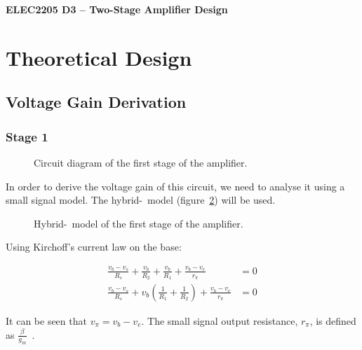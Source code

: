 \documentclass[a4paper,11pt]{article}
\begin{document}
  
\begin{center}
{\Large{\textbf{ELEC2205 D3 -- Two-Stage Amplifier Design}}} \\ [\baselineskip]

\end{center}

\begin{abstract}
\end{abstract}

\section{Theoretical Design}
\subsection{Voltage Gain Derivation}
\subsubsection{Stage 1}

\begin{figure}[h]
\centering
    
    \caption{Circuit diagram of the first stage of the amplifier.}
    \label{fig:stage1}
\end{figure}

In order to derive the voltage gain of this circuit, we need to analyse it using a small signal model. The hybrid-\textpi\ model (figure~\ref{fig:stage1hpi}) will be used.

\begin{figure}[h]
\centering
    
    \caption{Hybrid-\textpi\ model of the first stage of the amplifier.}
    \label{fig:stage1hpi}
\end{figure}

Using Kirchoff's current law on the base:

\begin{subequations}
\begin{align}
\frac{v_b - v_s}{R_s} + \frac{v_b}{R_2} + \frac{v_b}{R_1} + \frac{v_b - v_e}{r_\pi} &= 0\\
\frac{v_b - v_s}{R_s} + v_b \left(\frac{1}{R_1} + \frac{1}{R_2} \right) + \frac{v_b - v_e}{r_\pi} &= 0 \label{eq:kclBase}
\end{align}
\end{subequations}

It can be seen that $v_\pi = v_b - v_e$. The small signal output resistance, $r_\pi$, is defined as $\frac{\beta}{g_m}$~\cite[p. 29]{ADAIC}.
\end{document}
